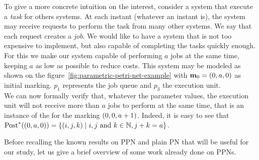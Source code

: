 To give a more concrete intuition on the interest, consider a system that execute a \emph{task} for others systems.
At each instant (whatever an instant is), the system may receive requests to perform the task from many other systems. We say that each request creates a \emph{job}.
We would like to have a system that is not too expensive to implement, but also capable of completing the tasks quickly enough.
For this we make our system capable of performing $a$ jobs at the same time, keeping $a$ as low as possible to reduce costs.
This system may be modeled as shown on the figure~\ref{fig:parametric-petri-net-example} with $\mari = (0, \param[1], 0)$ as initial marking.
$p_1$ represents the job queue and $p_3$ the execution unit.\\
We can now formally verify that, whatever the parameter values, the execution unit will not receive more than $a$ jobs to perform at the same time, that is an instance of the \Ecov for the marking $(0, 0, \param[1]+1)$. Indeed, it is easy to see that $\Post^*((0, \param[1], 0)) = \setComp{(i, j, k)}{i, j \text{ and } k \in \naturals, j + k = \param[1]}$.

Before recalling the known results on \ac{PPN} and plain \ac{PN} that will be useful for our study, let us give a brief overview of some work already done on \acp{PPN}.

